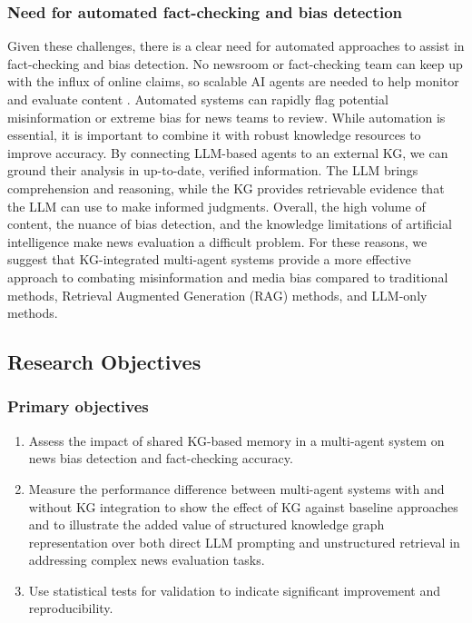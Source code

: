 \documentclass[11pt]{article}
\begin{document}
\subsubsection{Need for automated fact-checking and bias detection}
Given these challenges, there is a clear need for automated approaches to assist in fact-checking and bias detection. No newsroom or fact-checking team can keep up with the influx of online claims, so scalable AI agents are needed to help monitor and evaluate content  \cite{r12}. Automated systems can rapidly flag potential misinformation or extreme bias for news teams to review. While automation is essential, it is important to combine it with robust knowledge resources to improve accuracy. By connecting LLM-based agents to an external KG, we can ground their analysis in up-to-date, verified information. The LLM brings comprehension and reasoning, while the KG provides retrievable evidence that the LLM can use to make informed judgments. Overall, the high volume of content, the nuance of bias detection, and the knowledge limitations of artificial intelligence make news evaluation a difficult problem. For these reasons, we suggest that KG-integrated multi-agent systems provide a more effective approach to combating misinformation and media bias compared to traditional methods, Retrieval Augmented Generation (RAG) methods, and LLM-only methods.




\subsection{Research Objectives}
\subsubsection{Primary objectives}

\begin{enumerate}
    \item Assess the impact of shared KG-based memory in a multi-agent system on news bias detection and fact-checking accuracy.


    \item Measure the performance difference between multi-agent systems with and without KG integration to show the effect of KG against baseline approaches and to illustrate the added value of structured knowledge graph representation over both direct LLM prompting and unstructured retrieval in addressing complex news evaluation tasks.

    \item Use statistical tests for validation to indicate significant improvement and reproducibility. 
\end{enumerate}
\end{document}
